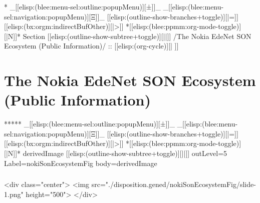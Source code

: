 \begin{whenOrg}
*  _[[elisp:(blee:menu-sel:outline:popupMenu)][±]]_ _[[elisp:(blee:menu-sel:navigation:popupMenu)][Ξ]]_ [[elisp:(outline-show-branches+toggle)][|=]] [[elisp:(bx:orgm:indirectBufOther)][|>]] *[[elisp:(blee:ppmm:org-mode-toggle)][|N]]*  Section    [[elisp:(outline-show-subtree+toggle)][||]]   /The Nokia EdeNet SON Ecosystem (Public Information)/ ::  [[elisp:(org-cycle)][| ]]
\end{whenOrg}

\section{The Nokia EdeNet SON Ecosystem (Public Information)}

\begin{whenOrg}
*****  _[[elisp:(blee:menu-sel:outline:popupMenu)][±]]_ _[[elisp:(blee:menu-sel:navigation:popupMenu)][Ξ]]_ [[elisp:(outline-show-branches+toggle)][|=]] [[elisp:(bx:orgm:indirectBufOther)][|>]] *[[elisp:(blee:ppmm:org-mode-toggle)][|N]]*  derivedImage [[elisp:(outline-show-subtree+toggle)][||]] outLevel=5 Label=nokiSonEcosystemFig  body=derivedImage
\end{whenOrg}

\begin{htmlonly}

\begin{frame}[fragile,plain,label=nokiSonEcosystemFig]
    \frametitle{}
    \framesubtitle{}
    \begin{rawhtml}
<div class="center">
<img src="./disposition.gened/nokiSonEcosystemFig/slide-1.png" height="500">
</div>
    \end{rawhtml}
\end{frame}
\end{htmlonly}


